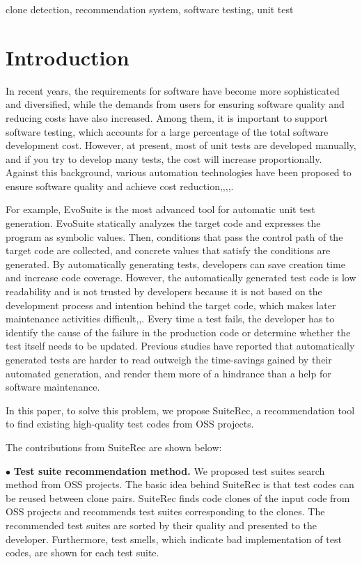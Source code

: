 \documentclass[conference]{IEEEtran}
\begin{document}
\begin{IEEEkeywords}
 clone detection, recommendation system, software testing, unit test 
\end{IEEEkeywords}

\section{Introduction}
In recent years, the requirements for software have become more sophisticated and diversified, while the demands from users for ensuring software quality and reducing costs have also increased. Among them, it is important to support software testing, which accounts for a large percentage of the total software development cost\cite{b20}. However, at present, most of unit tests are developed manually, and if you try to develop many tests, the cost will increase proportionally. Against this background, various automation technologies have been proposed to ensure software quality and achieve cost reduction\cite{b3},\cite{b16},\cite{b17},\cite{b18},\cite{b19}. 

For example, EvoSuite\cite{b3} is the most advanced tool for automatic unit test generation. EvoSuite statically analyzes the target code and expresses the program as symbolic values. Then, conditions that pass the control path of the target code are collected, and concrete values that satisfy the conditions are generated. By automatically generating tests, developers can save creation time and increase code coverage. However, the automatically generated test code is low readability and is not trusted by developers because it is not based on the development process and intention behind the target code, which makes later maintenance activities difficult\cite{b13},\cite{b14},\cite{b15}. Every time a test fails, the developer has to identify the cause of the failure in the production code or determine whether the test itself needs to be updated. Previous studies have reported that automatically generated tests are harder to read outweigh the time-savings gained by their automated generation, and render them more of a hindrance than a help for software maintenance\cite{b1}.

In this paper,  to solve this problem, we propose SuiteRec, a recommendation tool to find existing high-quality test codes from OSS projects. 

The contributions from SuiteRec are shown below:

\noindent
$\bullet$ \textbf{Test suite recommendation method.} We proposed test suites search method from OSS projects. The basic idea behind SuiteRec is that test codes can be reused between clone pairs. SuiteRec finds code clones of the input code from OSS projects and recommends test suites corresponding to the clones. The recommended test suites are sorted by their quality and presented to the developer. Furthermore, test smells, which indicate bad implementation of test codes, are shown for each test suite.
\end{document}
